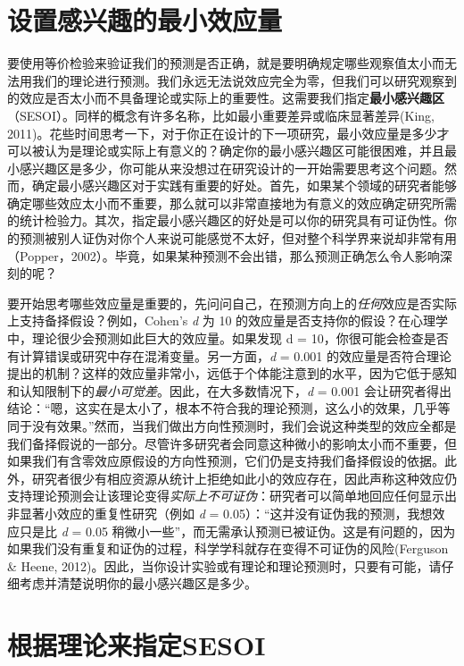 \documentclass[
  letterpaper,
  DIV=11,
  numbers=noendperiod]{scrreprt}
\begin{document}
\hypertarget{sec-sesoi}{%
\section{设置感兴趣的最小效应量}\label{sec-sesoi}}

要使用等价检验来验证我们的预测是否正确，就是要明确规定哪些观察值太小而无法用我们的理论进行预测。我们永远无法说效应完全为零，但我们可以研究观察到的效应是否太小而不具备理论或实际上的重要性。这需要我们指定\textbf{最小感兴趣区}（SESOI）。同样的概念有许多名称，比如最小重要差异或临床显著差异(King,
2011)。花些时间思考一下，对于你正在设计的下一项研究，最小效应量是多少才可以被认为是理论或实际上有意义的？确定你的最小感兴趣区可能很困难，并且最小感兴趣区是多少，你可能从来没想过在研究设计的一开始需要思考这个问题。然而，确定最小感兴趣区对于实践有重要的好处。首先，如果某个领域的研究者能够确定哪些效应太小而不重要，那么就可以非常直接地为有意义的效应确定研究所需的统计检验力。其次，指定最小感兴趣区的好处是可以你的研究具有可证伪性。你的预测被别人证伪对你个人来说可能感觉不太好，但对整个科学界来说却非常有用（Popper，2002）。毕竟，如果某种预测不会出错，那么预测正确怎么令人影响深刻的呢？

要开始思考哪些效应量是重要的，先问问自己，在预测方向上的\emph{任何}效应是否实际上支持备择假设？例如，Cohen's
\emph{d} 为 10
的效应量是否支持你的假设？在心理学中，理论很少会预测如此巨大的效应量。如果发现
d =
10，你很可能会检查是否有计算错误或研究中存在混淆变量。另一方面，\emph{d}
= 0.001
的效应量是否符合理论提出的机制？这样的效应量非常小，远低于个体能注意到的水平，因为它低于感知和认知限制下的\emph{最小可觉差}。因此，在大多数情况下，\emph{d}
= 0.001
会让研究者得出结论：``嗯，这实在是太小了，根本不符合我的理论预测，这么小的效果，几乎等同于没有效果。''然而，当我们做出方向性预测时，我们会说这种类型的效应全都是我们备择假说的一部分。尽管许多研究者会同意这种微小的影响太小而不重要，但如果我们有含零效应原假设的方向性预测，它们仍是支持我们备择假设的依据。此外，研究者很少有相应资源从统计上拒绝如此小的效应存在，因此声称这种效应仍支持理论预测会让该理论变得\emph{实际上不可证伪}：研究者可以简单地回应任何显示出非显著小效应的重复性研究（例如
\emph{d} = 0.05）：``这并没有证伪我的预测，我想效应只是比 \emph{d} =
0.05
稍微小一些''，而无需承认预测已被证伪。这是有问题的，因为如果我们没有重复和证伪的过程，科学学科就存在变得不可证伪的风险(Ferguson
\& Heene,
2012)。因此，当你设计实验或有理论和理论预测时，只要有可能，请仔细考虑并清楚说明你的最小感兴趣区是多少。

\hypertarget{ux6839ux636eux7406ux8bbaux6765ux6307ux5b9asesoi}{%
\section{根据理论来指定SESOI}\label{ux6839ux636eux7406ux8bbaux6765ux6307ux5b9asesoi}}
\end{document}
